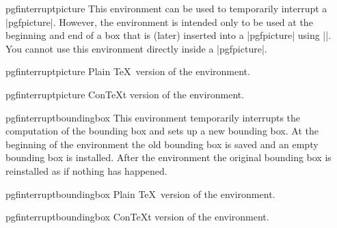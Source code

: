 \begin{environment}{{pgfinterruptpicture}}
    This environment can be used to temporarily interrupt a |{pgfpicture}|.
    However, the environment is intended only to be used at the beginning and
    end of a box that is (later) inserted into a |{pgfpicture}| using
    |\pgfqbox|. You cannot use this environment directly inside a
    |{pgfpicture}|.
\end{environment}

\begin{plainenvironment}{{pgfinterruptpicture}}
    Plain \TeX\ version of the environment.
\end{plainenvironment}

\begin{contextenvironment}{{pgfinterruptpicture}}
    Con\TeX t version of the environment.
\end{contextenvironment}

\begin{environment}{{pgfinterruptboundingbox}}
    This environment temporarily interrupts the computation of the bounding box
    and sets up a new bounding box. At the beginning of the environment the old
    bounding box is saved and an empty bounding box is installed. After the
    environment the original bounding box is reinstalled as if nothing has
    happened.
\end{environment}

\begin{plainenvironment}{{pgfinterruptboundingbox}}
    Plain \TeX\ version of the environment.
\end{plainenvironment}

\begin{contextenvironment}{{pgfinterruptboundingbox}}
    Con\TeX t version of the environment.
\end{contextenvironment}


